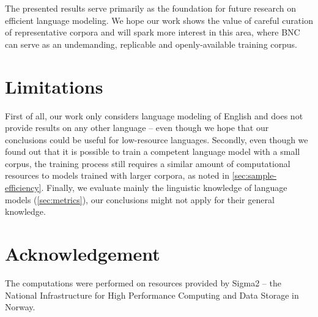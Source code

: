 The presented results serve primarily as the foundation for future research on efficient language modeling. We hope our work shows the value of careful curation of representative corpora and will spark more interest in this area, where BNC can serve as an undemanding, replicable and openly-available training corpus.%

\section{Limitations}

First of all, our work only considers language modeling of English and does not provide results on any other language -- even though we hope that our conclusions could be useful for low-resource languages. Secondly, even though we found out that it is possible to train a competent language model with a small corpus, the training process still requires a similar amount of computational resources to models trained with larger corpora, as noted in \cref{sec:sample-efficiency}. Finally, we evaluate mainly the linguistic knowledge of language models (\cref{sec:metrics}), our conclusions might not apply for their general knowledge.

\section*{Acknowledgement}
The computations were performed on resources provided by Sigma2 -- the National Infrastructure for High Performance Computing and Data Storage in Norway.

    
            
    \clearpage

